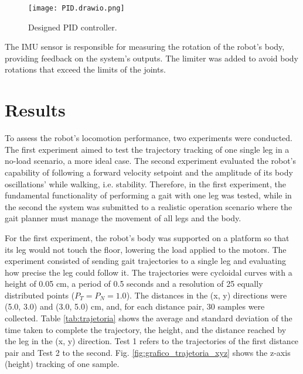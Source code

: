 \documentclass[conference]{IEEEtran}
\begin{document}
\begin{figure}[b]
  \centering
  \texttt{[image: PID.drawio.png]}
  \caption{Designed PID controller.}
  \label{fig:pid}
\end{figure}

The IMU sensor is responsible for measuring the rotation of the robot's body, providing feedback on the system's outputs. The limiter was added to avoid body rotations that exceed the limits of the joints.

\section{Results} \label{results}

To assess the robot's locomotion performance, two experiments were conducted. The first experiment aimed to test the trajectory tracking of one single leg in a no-load scenario, a more ideal case. The second experiment evaluated the robot's capability of following a forward velocity setpoint and the amplitude of its body oscillations' while walking, i.e. stability. Therefore, in the first experiment, the fundamental functionality of performing a gait with one leg was tested, while in the second the system was submitted to a realistic operation scenario where the gait planner must manage the movement of all legs and the body.

For the first experiment, the robot's body was supported on a platform so that its leg would not touch the floor, lowering the load applied to the motors. The experiment consisted of sending gait trajectories to a single leg and evaluating how precise the leg could follow it. The trajectories were cycloidal curves with a height of 0.05 cm, a period of 0.5 seconds and a resolution of 25 equally distributed points ($P_T = P_N = 1.0$). The distances in the (x, y) directions were (5.0, 3.0) and (3.0, 5.0) cm, and, for each distance pair, 30 samples were collected. Table \ref{tab:trajetoria} shows the average and standard deviation of the time taken to complete the trajectory, the height, and the distance reached by the leg in the (x, y) direction. Test 1 refers to the trajectories of the first distance pair and Test 2 to the second. Fig. \ref{fig:grafico_trajetoria_xyz} shows the z-axis (height) tracking of one sample. 
\end{document}
